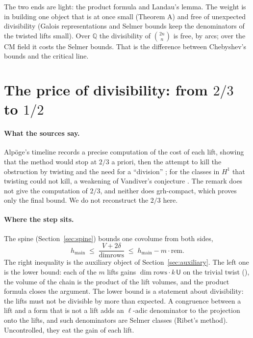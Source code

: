 \documentclass[11pt]{article}
\theoremstyle{definition}
\theoremstyle{remark}
\begin{document}
The two ends are light: the product formula and Landau's lemma. The weight is in building one object
that is at once small (Theorem A) and free of unexpected divisibility (Galois representations and
Selmer bounds keep the denominators of the twisted lifts small). Over $\mathbb Q$ the divisibility
of $\binom{2n}{n}$ is free, by arcs; over the CM field it costs the Selmer bounds. That is the
difference between Chebyshev's bounds and the critical line.

\section{The price of divisibility: from $2/3$ to $1/2$}\label{sec:selmer}

\paragraph{What the sources say.} Alpöge's timeline records a precise computation of the cost of
each lift, showing that the method would stop at $2/3$ a priori, then the attempt to kill the
obstruction by twisting and the need for a ``division'' \cite[item 14]{Alpoge2026}; for the
classes in $H^1$ that twisting could not kill, a weakening of Vandiver's conjecture
\cite[item 17]{Alpoge2026}. The remark does not give the computation of $2/3$, and neither does
grh-compact, which proves only the final bound. We do not reconstruct the $2/3$ here.

\paragraph{Where the step sits.} The spine (Section~\ref{sec:spine}) bounds one covolume from
both sides,
\[
h_{\mathrm{main}}\;\le\;\frac{V+2\delta}{\dim\text{rows}}\;\le\;h_{\mathrm{main}}-m\cdot\mathrm{rem}.
\]
The right inequality is the auxiliary object of Section~\ref{sec:auxiliary}. The left one is the
lower bound: each of the $m$ lifts gains $\dim\text{rows}\cdot k\,\mathsf U$ on the trivial twist
(), the volume of the chain is the product of the lift volumes,
and the product formula closes the argument. The lower bound is a statement about divisibility: the
lifts must not be divisible by more than expected. A congruence between a lift and a form that is
not a lift adds an $\ell$-adic denominator to the projection onto the lifts, and such denominators
are Selmer classes (Ribet's method). Uncontrolled, they eat the gain of each lift.
\end{document}
